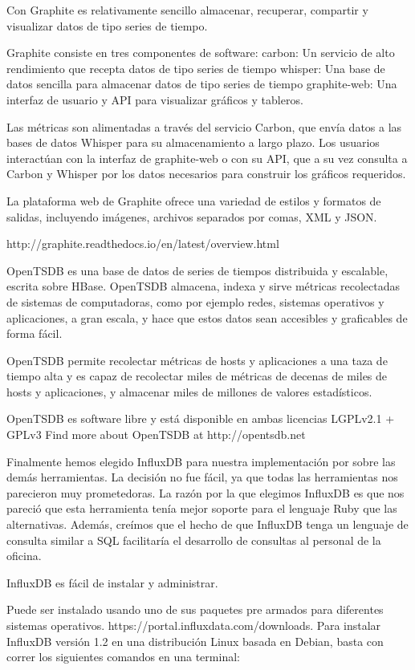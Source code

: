 Con Graphite es relativamente sencillo almacenar, recuperar, compartir y visualizar datos de tipo series de tiempo.

Graphite consiste en tres componentes de software:
carbon: Un servicio de alto rendimiento que recepta datos de tipo series de tiempo
whisper: Una base de datos sencilla para almacenar datos de tipo series de tiempo
graphite-web: Una interfaz de usuario y API para visualizar gráficos y tableros.

Las métricas son alimentadas a través del servicio Carbon, que envía datos a las bases de datos Whisper para su almacenamiento a largo plazo. Los usuarios interactúan con la interfaz de graphite-web o con su API, que a su vez consulta a Carbon y Whisper por los datos necesarios para construir los gráficos requeridos.

La plataforma web de Graphite ofrece una variedad de estilos y formatos de salidas, incluyendo imágenes, archivos separados por comas, XML y JSON. 

http://graphite.readthedocs.io/en/latest/overview.html

OpenTSDB es una base de datos de series de tiempos distribuida y escalable, escrita sobre HBase. OpenTSDB almacena, indexa y sirve métricas recolectadas de sistemas de computadoras, como por ejemplo redes, sistemas operativos y aplicaciones, a gran escala, y hace que estos datos sean accesibles y graficables de forma fácil.

OpenTSDB permite recolectar métricas de hosts y aplicaciones a una taza de tiempo alta y es capaz de recolectar miles de métricas de decenas de miles de hosts y aplicaciones, y almacenar miles de millones de valores estadísticos.

OpenTSDB es software libre y está disponible en ambas licencias LGPLv2.1 + GPLv3
Find more about OpenTSDB at http://opentsdb.net

Finalmente hemos elegido InfluxDB para nuestra implementación por sobre las demás herramientas. La decisión no fue fácil, ya que todas las herramientas nos parecieron muy prometedoras. La razón por la que elegimos InfluxDB es que nos pareció que esta herramienta tenía mejor soporte para el lenguaje Ruby que las alternativas. Además, creímos que el hecho de que InfluxDB tenga un lenguaje de consulta similar a SQL facilitaría el desarrollo de consultas al personal de la oficina.

InfluxDB es fácil de instalar y administrar.

Puede ser instalado usando uno de sus paquetes pre armados para diferentes sistemas operativos. https://portal.influxdata.com/downloads. Para instalar InfluxDB versión 1.2 en una distribución Linux basada en Debian, basta con correr los siguientes comandos en una terminal:


